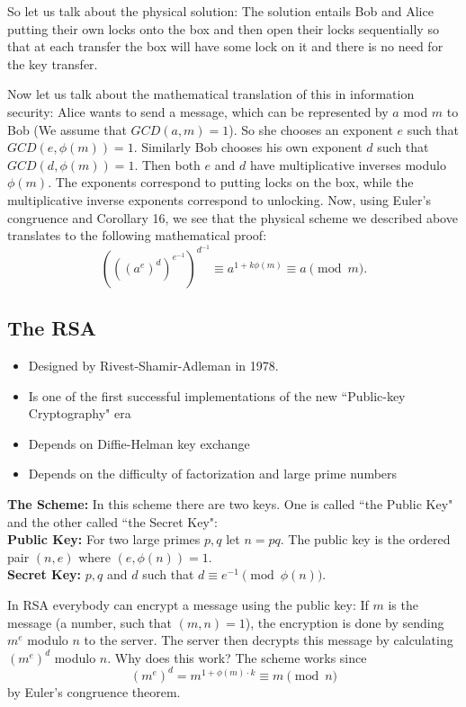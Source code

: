 \documentclass[12pt]{article}
\theoremstyle{plain}
\theoremstyle{definition}
\theoremstyle{remark}
\begin{document}
\bigskip
\noindent
So let us talk about the physical solution: The solution entails Bob and Alice putting their own locks onto the box and then open their locks sequentially so that at each transfer the box will have some lock on it and there is no need for the key transfer.

\bigskip
\noindent
Now let us talk about the mathematical translation of this in information security:
Alice wants to send a message, which can be represented by $a$ mod $m$ to Bob (We assume that $GCD(a,m)=1$). So she chooses an exponent $e$ such that $GCD(e, \phi(m))=1$. Similarly Bob chooses his own exponent $d$ such that $GCD(d, \phi(m))=1$. Then both $e$ and $d$ have multiplicative inverses modulo $\phi(m)$. The exponents correspond to putting locks on the box, while the multiplicative inverse exponents correspond to unlocking.  Now, using Euler's congruence and Corollary 16, we see that the physical scheme we described above translates to the following mathematical proof:
$$(((a^e)^d)^{e^{-1}})^{d^{-1}} \equiv a^{1+k\phi(m)}\equiv a \pmod{m}.$$

\subsection{The RSA}
\begin{itemize}
    \item Designed by Rivest-Shamir-Adleman in 1978.
    \item Is one of the first successful implementations of the new ``Public-key Cryptography" era
    \item Depends on Diffie-Helman key exchange
    \item Depends on the difficulty of factorization and large prime numbers
\end{itemize}

\bigskip
\noindent
{\bf The Scheme:} In this scheme there are two keys. One is called ``the Public Key" and the other called ``the Secret Key":
\\
{\bf Public Key:} For two large primes $p, q$ let $n=pq$. The public key is the ordered pair $(n,e)$ where $(e, \phi(n))=1$.
\\
{\bf Secret Key:} $p, q$ and $d$ such that $d\equiv e^{-1} \pmod{\phi(n)}$.

\bigskip
\noindent
In RSA everybody can encrypt a message using the public key: If $m$ is the message (a number, such that $(m,n)=1$), the encryption is done by sending $m^e$ modulo $n$ to the server. The server then decrypts this message by calculating $(m^e)^d$ modulo $n$. Why does this work?
The scheme works since
$$(m^e)^d = m^{1+\phi(m)\cdot k} \equiv m \pmod{n}$$
by Euler's congruence theorem.
\end{document}
